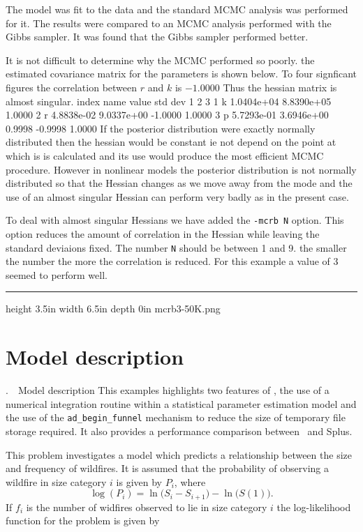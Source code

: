 \documentclass[12pt]{book}
\makeatletter
\def\mysection#1{\section{#1}{\bigbf \medbreak\noindent\number\c@chapter.\number\c@section\ \ #1\medbreak}}
\makeatother
\begin{document}
The model was fit to the data and the standard MCMC analysis was performed
for it. The results were compared to an MCMC analysis performed with
the Gibbs sampler. It was found that the Gibbs sampler performed better.

It is not difficult to determine why the MCMC performed so poorly.
the estimated covariance matrix for the parameters is shown below.
To four signficant figures the correlation between $r$ and $k$
is $-1.0000$ Thus the hessian matrix is almost singular.
\beginexample
   index   name    value      std dev     1      2       3   
     1   k     1.0404e+04 8.8390e+05   1.0000
     2   r     4.8838e-02 9.0337e+00  -1.0000  1.0000
     3   p     5.7293e-01 3.6946e+00   0.9998 -0.9998  1.0000
\endexample
If the posterior distribution were exactly normally distributed then
the hessian would be constant ie not depend on the
point at which is is calculated and its use would 
produce the most efficient MCMC
procedure. However in nonlinear models the posterior distribution is
not normally distributed so that the Hessian changes as we move away
from the mode and the use of an almost singular
Hessian can perform very badly as in the present case.

To deal with almost singular Hessians we have added the {\tt -mcrb N}
option.
This option reduces the amount of correlation in the Hessian while leaving
the standard deviaions fixed. The number {\tt N} should be between
1 and 9. the smaller the number the more the correlation is reduced.
For this example a value of 3 seemed to perform well.
\vfill
\hrule
\pdfximage  height 3.5in width 6.5in depth 0in {mcrb3-50K.png}
\vfill


\endchapter
\htmlnewfile

\mysection{Model description}
This examples highlights two features of \ADM, the use of a numerical
integration routine within a statistical parameter estimation model
and the use of the {\tt ad\_begin\_funnel} mechanism to reduce the size
of temporary file storage required. It also provides a performance comparison between
\ADM\ and Splus.

This problem investigates a model which predicts a relationship
between the size and frequency of wildfires.
It is assumed that the probability of observing a wildfire
in size category $i$ is given by $P_i$, where
$$\log(P_i)=\ln\big(S_i-S_{i+1}\big)-\ln\big(S(1)\big).$$
If $f_i$ is the number of widfires observed to lie in
size category $i$ the log-likelihood function for the problem is given by
\end{document}
